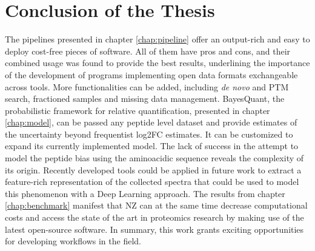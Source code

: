 \chapter{Conclusion of the Thesis}
\label{chap:conclusion}

The pipelines presented in chapter \ref{chap:pipeline} offer an output-rich and easy to deploy cost-free pieces of software. All of them have pros and cons, and their combined usage was found to provide the best results, underlining the importance of the development of programs implementing open data formats exchangeable across tools. More functionalities can be added, including \textit{de novo} and \ac{PTM} search, fractioned samples and missing data management. BayesQuant, the probabilistic framework for relative quantification, presented in chapter \ref{chap:model}, can be passed any peptide level dataset and provide estimates of the uncertainty beyond frequentist \ac{log2FC} estimates. It can be customized to expand its currently implemented model. The lack of success in the attempt to model the peptide bias using the aminoacidic sequence reveals the complexity of its origin. Recently developed tools  could be applied in future work to extract a feature-rich representation of the collected spectra that could be used to model this phenomenon with a Deep Learning approach. The results from chapter \ref{chap:benchmark} manifest that \ac{NZ} can at the same time decrease computational costs and access the state of the art in proteomics research by making use of the latest open-source software. In summary, this work grants exciting opportunities for developing workflows in the field.
